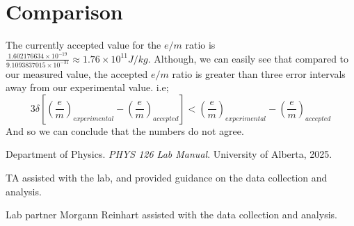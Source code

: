 \documentclass[12pt]{article}
\begin{document}
\section{Comparison}
The currently accepted value for the $e/m$ ratio is $\frac{1.602176634 \times 10^{-19}}{9.1093837015 \times 10^{-31}} \approx 1.76 \times 10^{11} J/kg$.
Although, we can easily see that compared to our measured value, the accepted $e/m$ ratio is greater than three error intervals away from our experimental value.
i.e;
\begin{equation*}
    3\delta\left[\left(\frac{e}{m}\right)_{experimental} - \left(\frac{e}{m}\right)_{accepted}\right] < \left(\frac{e}{m}\right)_{experimental} - \left(\frac{e}{m}\right)_{accepted}
\end{equation*} 
And so we can conclude that the numbers do not agree.
\renewcommand{\bibname}{5\ \ \References and Acknowledgements}
\begin{thebibliography}{9}
    Department of Physics. \textit{PHYS 126 Lab Manual}. University of Alberta, 2025.

    TA assisted with the lab, and provided guidance on the data collection and analysis.

    Lab partner Morgann Reinhart assisted with the data collection and analysis.
    
\end{thebibliography}
\end{document}
